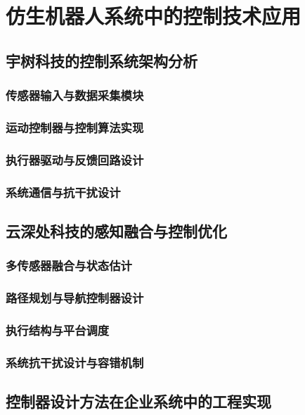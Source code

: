 \section{仿生机器人系统中的控制技术应用}
\subsection{宇树科技的控制系统架构分析}

\subsubsection{传感器输入与数据采集模块}

\subsubsection{运动控制器与控制算法实现}

\subsubsection{执行器驱动与反馈回路设计}

\subsubsection{系统通信与抗干扰设计}

\subsection{云深处科技的感知融合与控制优化}

\subsubsection{多传感器融合与状态估计}

\subsubsection{路径规划与导航控制器设计}

\subsubsection{执行结构与平台调度}

\subsubsection{系统抗干扰设计与容错机制}

\subsection{控制器设计方法在企业系统中的工程实现}

\newpage
